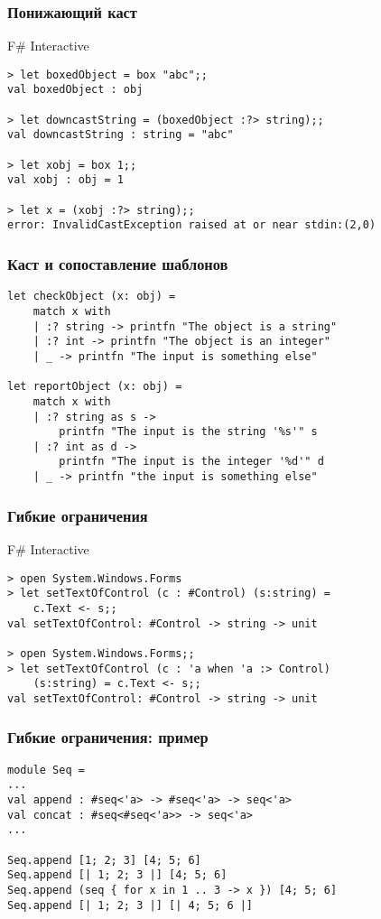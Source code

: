 \documentclass[xetex,mathserif,serif]{beamer}
\begin{document}
	\begin{frame}[fragile]
		\frametitle{Понижающий каст}
		\begin{alertblock}{F\# Interactive}
			\begin{verbatim}
> let boxedObject = box "abc";;
val boxedObject : obj

> let downcastString = (boxedObject :?> string);;
val downcastString : string = "abc"

> let xobj = box 1;;
val xobj : obj = 1

> let x = (xobj :?> string);;
error: InvalidCastException raised at or near stdin:(2,0)
			\end{verbatim}
		\end{alertblock}
\end{frame}

	\begin{frame}[fragile]
		\frametitle{Каст и сопоставление шаблонов}
		\begin{verbatim}
let checkObject (x: obj) =
    match x with
    | :? string -> printfn "The object is a string"
    | :? int -> printfn "The object is an integer"
    | _ -> printfn "The input is something else"

let reportObject (x: obj) =
    match x with
    | :? string as s -> 
        printfn "The input is the string '%s'" s
    | :? int as d -> 
        printfn "The input is the integer '%d'" d
    | _ -> printfn "the input is something else"
		\end{verbatim}
\end{frame}

	\begin{frame}[fragile]
		\frametitle{Гибкие ограничения}
		\begin{alertblock}{F\# Interactive}
			\begin{verbatim}
> open System.Windows.Forms
> let setTextOfControl (c : #Control) (s:string) = 
    c.Text <- s;;
val setTextOfControl: #Control -> string -> unit

> open System.Windows.Forms;;
> let setTextOfControl (c : 'a when 'a :> Control) 
    (s:string) = c.Text <- s;;
val setTextOfControl: #Control -> string -> unit
			\end{verbatim}
		\end{alertblock}
\end{frame}

	\begin{frame}[fragile]
		\frametitle{Гибкие ограничения: пример}
		\begin{verbatim}
module Seq =
...
val append : #seq<'a> -> #seq<'a> -> seq<'a>
val concat : #seq<#seq<'a>> -> seq<'a>
...

Seq.append [1; 2; 3] [4; 5; 6]
Seq.append [| 1; 2; 3 |] [4; 5; 6]
Seq.append (seq { for x in 1 .. 3 -> x }) [4; 5; 6]
Seq.append [| 1; 2; 3 |] [| 4; 5; 6 |]
		\end{verbatim}
\end{frame}
\end{document}
